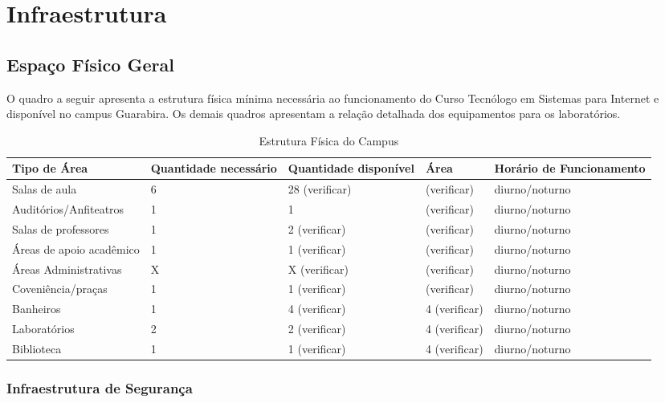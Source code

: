 \newpage
\section{Infraestrutura}

\subsection{Espa\c{c}o F\'isico Geral}

O quadro a seguir apresenta a estrutura física m\'inima necessária ao funcionamento do Curso Tecn\'ologo em Sistemas para Internet e dispon\'ivel no campus Guarabira. Os demais quadros apresentam a relação detalhada dos equipamentos para os laboratórios.

\begin{table}[h]
\caption{Estrutura F\'isica do Campus}
\begin{center}
\begin{tabular}{|p{4.5cm}|p{2.2cm}|p{2.2cm}|p{2.2cm}|p{3.0cm}|}
\hline
Tipo de \'Area & Quantidade necess\'ario & Quantidade dispon\'ivel & \'Area  & Hor\'ario de Funcionamento\\
\hline 
\hline
Salas de aula &  6 & 28 (verificar) & (verificar) & diurno/noturno \\
\hline
Audit\'orios/Anfiteatros &  1 & 1 & (verificar) & diurno/noturno \\
\hline
Salas de professores & 1 & 2 (verificar) & (verificar) & diurno/noturno \\
\hline
\'Areas de apoio acad\^emico & 1 & 1 (verificar) & (verificar) & diurno/noturno \\
\hline
\'Areas Administrativas & X & X (verificar) & (verificar) & diurno/noturno \\
\hline
Coveni\^encia/pra\c{c}as & 1 & 1 (verificar) & (verificar) & diurno/noturno \\
\hline
Banheiros & 1 & 4 (verificar) & 4 (verificar) & diurno/noturno \\
\hline
Laborat\'orios & 2 & 2 (verificar) & 4 (verificar) & diurno/noturno \\
\hline
Biblioteca & 1 & 1 (verificar) & 4 (verificar) & diurno/noturno \\
\hline
\end{tabular} 
\end{center}
\label{tab:pl}
\end{table}

\subsubsection{Infraestrutura de Seguran\c{c}a}

